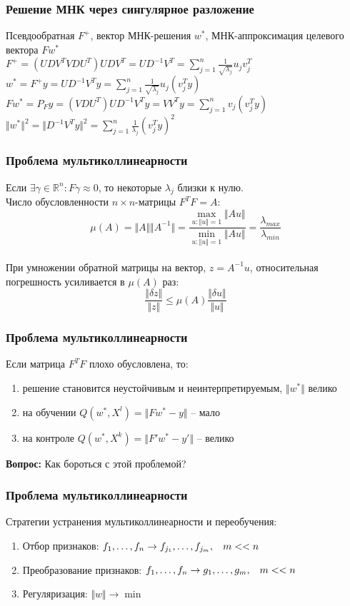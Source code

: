 \documentclass[12pt]{beamer}
\begin{document}
\begin{frame}\frametitle{Решение МНК через сингулярное разложение}
Псевдообратная $F^+$, вектор МНК-решения $w^*$,
МНК-аппроксимация целевого вектора $Fw^*$\\
$F^+ = (UDV^TVDU^T)UDV^T = UD^{-1}V^T = \sum\limits_{j=1}^n \frac{1}{\sqrt{\lambda_j}}  u_j v_j^T$\\
$ w^* = F^+y = UD^{-1}V^Ty = \sum\limits_{j=1}^n \frac{1}{\sqrt{\lambda_j}}  u_j (v_j^Ty)$\\
$F w^* = P_F y = (VDU^T)UD^{-1}V^Ty = VV^Ty = \sum\limits_{j=1}^n v_j (v_j^Ty)$\\
$\Vert w^* \Vert^2  = \Vert D^{-1}V^Ty \Vert^2 = \sum\limits_{j=1}^n \frac{1}{\lambda_j} (v_j^Ty)^2$
\end{frame}

\begin{frame}\frametitle{Проблема мультиколлинеарности}
Если $\exists \gamma \in \mathbb{R}^n: F\gamma \approx 0$, то некоторые $\lambda_j$ близки к нулю.\\
Число обусловленности $n \times n$-матрицы $F^TF = A$:
$$\mu(A) = \Vert A \Vert \Vert A^{-1} \Vert = \frac{\max\limits_{u: \Vert u \Vert = 1} \Vert A u \Vert}{\min\limits_{u: \Vert u \Vert = 1} \Vert A u \Vert} = \frac{\lambda_{max}}{\lambda_{min}}$$\\
При умножении обратной матрицы на вектор, $z = A^{-1}u$, относительная погрешность усиливается в $\mu(A)$ раз:\\
$$\frac{\Vert \delta z \Vert}{\Vert z \Vert } \leq \mu(A) \frac{\Vert \delta u \Vert}{\Vert u \Vert }$$
\end{frame}

\begin{frame}\frametitle{Проблема мультиколлинеарности}
Если матрица $F^TF$ плохо обусловлена, то: 
\begin{enumerate}[--]
\item решение становится неустойчивым и неинтерпретируемым, $\Vert w^* \Vert $ велико
\item на обучении $Q(w^*, X^l) = \Vert Fw^* -y \Vert$ -- мало   
\item на контроле $Q(w^*, X^k) = \Vert F'w^* -y' \Vert$ -- велико
\end{enumerate}
\textbf{Вопрос:} Как бороться с этой проблемой?
\end{frame}

\begin{frame}\frametitle{Проблема мультиколлинеарности}
Стратегии устранения мультиколлинеарности и переобучения:
\begin{enumerate}[--]
\item Отбор признаков: $f_1, \dots, f_n \rightarrow f_{j_1}, \dots, f_{j_m}, \hspace{3mm} m << n$
\item Преобразование признаков: $f_1, \dots, f_n \rightarrow g_1, \dots, g_m,\hspace{3mm}  m << n$
\item Регуляризация: $\Vert w \Vert \rightarrow \min$
\end{enumerate}
\end{frame}
\end{document}
